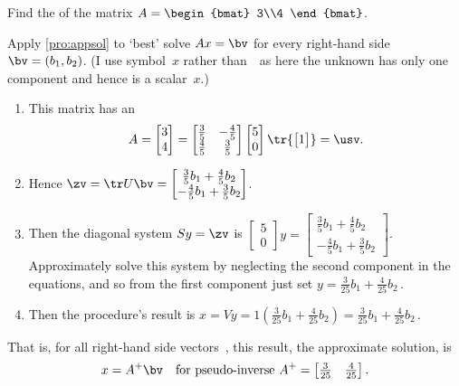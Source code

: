 \begin{example} \label{eg:psinv34}
Find the  of the matrix \(A=\begin{bmat} 3\\4 \end{bmat}\).
\begin{solution} 
Apply \cref{pro:appsol} to `best' solve \(Ax=\bv\) for every right-hand side~\(\bv=(b_1,b_2)\).
(I use symbol~\(x\) rather than~\xv\ as here the unknown has only one component and hence is a scalar~\(x\).)
\begin{enumerate}
\item This matrix has an \svd\ 
\begin{equation*}
A=\begin{bmatrix} 3\\4 \end{bmatrix}
=\begin{bmatrix} \frac35&-\frac45\\\frac45&\frac35 \end{bmatrix}
\begin{bmatrix} 5\\0 \end{bmatrix}\tr{\begin{bmatrix} 1 \end{bmatrix}}
=\usv.
\end{equation*}

\item Hence \(\zv=\tr U\bv=\begin{bmatrix} \tfrac35b_1+\tfrac45b_2\\-\tfrac45b_1+\tfrac35b_2 \end{bmatrix}\).
\item Then the diagonal system \(Sy=\zv\) is \(\begin{bmatrix} 5\\0 \end{bmatrix}y=\begin{bmatrix} \tfrac35b_1+\tfrac45b_2\\-\tfrac45b_1+\tfrac35b_2 \end{bmatrix}\). 
Approximately solve this system by neglecting the second component in the equations, and so from the first component just set \(y=\tfrac3{25}b_1+\tfrac4{25}b_2\)\,.
\item Then the procedure's result is \(x=Vy=1(\tfrac3{25}b_1+\tfrac4{25}b_2)=\tfrac3{25}b_1+\tfrac4{25}b_2\)\,.
\end{enumerate}
That is, for all right-hand side vectors~\bv, this result, the  approximate solution, is
\begin{equation*}
x=A^+\bv\quad\text{for pseudo-inverse }A^+=\begin{bmatrix} \tfrac3{25}& \tfrac4{25} \end{bmatrix}.
\end{equation*}
\end{solution}
\end{example}



